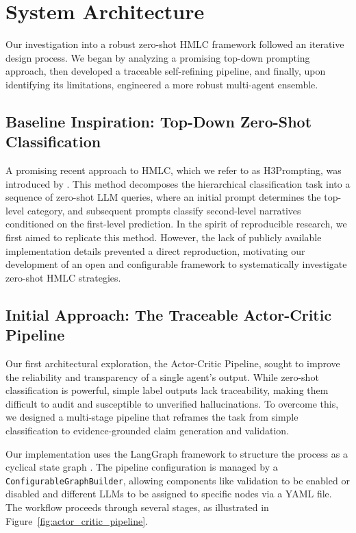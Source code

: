\section{System Architecture}

Our investigation into a robust zero-shot HMLC framework followed an iterative design process. We began by analyzing a promising top-down prompting approach, then developed a traceable self-refining pipeline, and finally, upon identifying its limitations, engineered a more robust multi-agent ensemble.

\subsection{Baseline Inspiration: Top-Down Zero-Shot Classification}

A promising recent approach to HMLC, which we refer to as H3Prompting, was introduced by \citet{singh-etal-2025-gatenlp}. This method decomposes the hierarchical classification task into a sequence of zero-shot LLM queries, where an initial prompt determines the top-level category, and subsequent prompts classify second-level narratives conditioned on the first-level prediction. In the spirit of reproducible research, we first aimed to replicate this method. However, the lack of publicly available implementation details prevented a direct reproduction, motivating our development of an open and configurable framework to systematically investigate zero-shot HMLC strategies.

\subsection{Initial Approach: The Traceable Actor-Critic Pipeline}

Our first architectural exploration, the Actor-Critic Pipeline, sought to improve the reliability and transparency of a single agent's output. While zero-shot classification is powerful, simple label outputs lack traceability, making them difficult to audit and susceptible to unverified hallucinations. To overcome this, we designed a multi-stage pipeline that reframes the task from simple classification to evidence-grounded claim generation and validation.

Our implementation uses the LangGraph framework to structure the process as a cyclical state graph \citep{langgraph2024}. The pipeline configuration is managed by a \texttt{ConfigurableGraphBuilder}, allowing components like validation to be enabled or disabled and different LLMs to be assigned to specific nodes via a YAML file. The workflow proceeds through several stages, as illustrated in Figure~\ref{fig:actor_critic_pipeline}.

